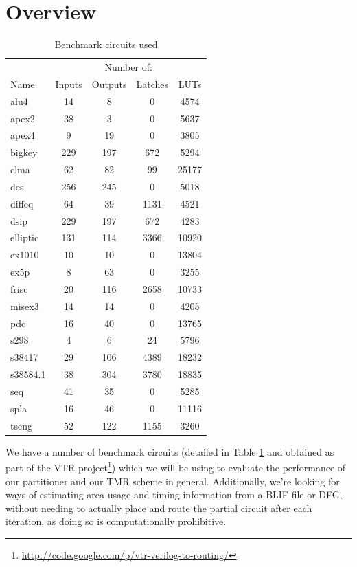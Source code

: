 \documentclass[12pt,final,oneside]{memoir} %
\begin{document}
\section{Overview}
\begin{table}
    \begin{center}
        \begin{tabular}{lcccc}
        \toprule
         & \multicolumn{4}{c}{Number of:}\\
         \cmidrule{2-5}
         Name & Inputs & Outputs & Latches & \acp{LUT}\\
         \midrule
            alu4 & 14 & 8 & 0 & 4574\\
            apex2 & 38 & 3 & 0 & 5637\\
            apex4 & 9 & 19 & 0 & 3805\\
            bigkey & 229 & 197 & 672 & 5294\\
            clma & 62 & 82 & 99 & 25177\\
            des & 256 & 245 & 0 & 5018\\
            diffeq & 64 & 39 & 1131 & 4521\\
            dsip & 229 & 197 & 672 & 4283\\
            elliptic & 131 & 114 & 3366 & 10920\\
            ex1010 & 10 & 10 & 0 & 13804\\
            ex5p & 8 & 63 & 0 & 3255\\
            frisc & 20 & 116 & 2658 & 10733\\
            misex3 & 14 & 14 & 0 & 4205\\
            pdc & 16 & 40 & 0 & 13765\\
            s298     & 4 & 6 & 24 & 5796\\
            s38417   & 29 & 106 & 4389 & 18232\\
            s38584.1 & 38 & 304 & 3780 & 18835\\
            seq      & 41 & 35 & 0 & 5285\\
            spla     & 16 & 46 & 0 & 11116\\
            tseng    & 52 & 122 & 1155 & 3260\\
            \bottomrule
        \end{tabular}
        \caption{Benchmark circuits used}
        \label{benchmarkList}
    \end{center}
\end{table}

We have a number of benchmark circuits (detailed in Table \ref{benchmarkList} and obtained as part of the \ac{VTR} project\footnote{\url{http://code.google.com/p/vtr-verilog-to-routing/}}) which we will be using to evaluate the performance of our partitioner and our \ac{TMR} scheme in general.
Additionally, we're looking for ways of estimating area usage and timing information from a \ac{BLIF} file or \ac{DFG}, without needing to actually place and route the partial circuit after each iteration, as doing so is computationally prohibitive.
\end{document}
